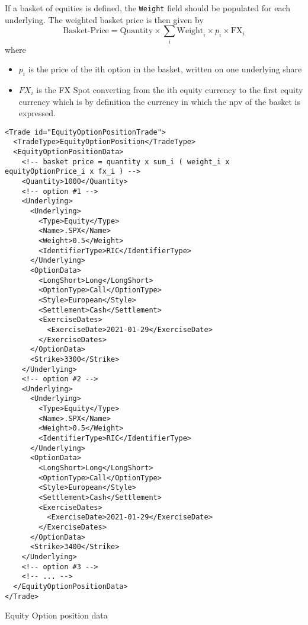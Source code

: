 If a basket of equities is defined, the \verb+Weight+ field should be populated for each underlying. The weighted basket
price is then given by
$$\text{Basket-Price} = \text{Quantity} \times \sum_i \text{Weight}_i \times p_i \times \text{FX}_i$$
where
\begin{itemize}
\item $p_i$ is the price of the ith option in the basket, written on one underlying share
\item $FX_i$ is the FX Spot converting from the ith equity currency to the first equity currency which is by definition
  the currency in which the npv of the basket is expressed.
\end{itemize}

\begin{listing}[H]
\begin{verbatim}
<Trade id="EquityOptionPositionTrade">
  <TradeType>EquityOptionPosition</TradeType>
  <EquityOptionPositionData>
    <!-- basket price = quantity x sum_i ( weight_i x equityOptionPrice_i x fx_i ) -->
    <Quantity>1000</Quantity>
    <!-- option #1 -->
    <Underlying>
      <Underlying>
        <Type>Equity</Type>
        <Name>.SPX</Name>
        <Weight>0.5</Weight>
        <IdentifierType>RIC</IdentifierType>
      </Underlying>
      <OptionData>
        <LongShort>Long</LongShort>
        <OptionType>Call</OptionType>
        <Style>European</Style>
        <Settlement>Cash</Settlement>
        <ExerciseDates>
          <ExerciseDate>2021-01-29</ExerciseDate>
        </ExerciseDates>
      </OptionData>
      <Strike>3300</Strike>
    </Underlying>
    <!-- option #2 -->
    <Underlying>
      <Underlying>
        <Type>Equity</Type>
        <Name>.SPX</Name>
        <Weight>0.5</Weight>
        <IdentifierType>RIC</IdentifierType>
      </Underlying>
      <OptionData>
        <LongShort>Long</LongShort>
        <OptionType>Call</OptionType>
        <Style>European</Style>
        <Settlement>Cash</Settlement>
        <ExerciseDates>
          <ExerciseDate>2021-01-29</ExerciseDate>
        </ExerciseDates>
      </OptionData>
      <Strike>3400</Strike>
    </Underlying>
    <!-- option #3 -->
    <!-- ... -->
  </EquityOptionPositionData>
</Trade>
\end{verbatim}
\caption{Equity Option position data}
\label{lst:equityoptionpositiondata}
\end{listing}
